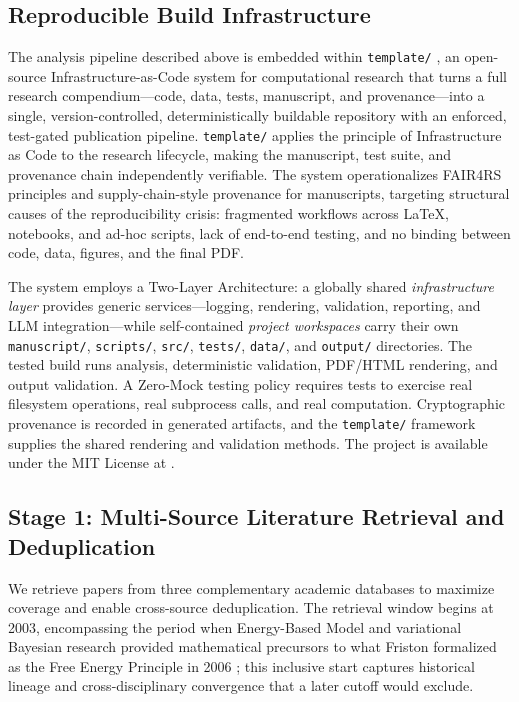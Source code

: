 \documentclass[
  english,
]{article}
\begin{document}
\subsection{Reproducible Build
Infrastructure}\label{reproducible-build-infrastructure}

The analysis pipeline described above is embedded within
\texttt{template/}
\citep{Friedman2026TemplateReproducibleGenerative, FriedmanTemplateSoftware},
an open-source Infrastructure-as-Code system for computational research
that turns a full research compendium---code, data, tests, manuscript,
and provenance---into a single, version-controlled, deterministically
buildable repository with an enforced, test-gated publication pipeline.
\texttt{template/} applies the principle of Infrastructure as Code to
the research lifecycle, making the manuscript, test suite, and
provenance chain independently verifiable. The system operationalizes
FAIR4RS principles \citep{wilkinson2016fair} and supply-chain-style
provenance for manuscripts, targeting structural causes of the
reproducibility crisis: fragmented workflows across LaTeX, notebooks,
and ad-hoc scripts, lack of end-to-end testing, and no binding between
code, data, figures, and the final PDF.

The system employs a Two-Layer Architecture: a globally shared
\emph{infrastructure layer} provides generic services---logging,
rendering, validation, reporting, and LLM integration---while
self-contained \emph{project workspaces} carry their own
\texttt{manuscript/}, \texttt{scripts/}, \texttt{src/}, \texttt{tests/},
\texttt{data/}, and \texttt{output/} directories. The tested build runs
analysis, deterministic validation, PDF/HTML rendering, and output
validation. A Zero-Mock testing policy requires tests to exercise real
filesystem operations, real subprocess calls, and real computation.
Cryptographic provenance is recorded in generated artifacts, and the
\texttt{template/} framework supplies the shared rendering and
validation methods. The project is available under the MIT License at
.

\newpage

\subsection{Stage 1: Multi-Source Literature Retrieval and
Deduplication}\label{sec:methods_retrieval}

We retrieve papers from three complementary academic databases to
maximize coverage and enable cross-source deduplication. The retrieval
window begins at 2003, encompassing the period when Energy-Based Model
and variational Bayesian research
\citep{dayan1995helmholtz, lecun2006tutorial} provided mathematical
precursors to what Friston formalized as the Free Energy Principle in
2006 \citep{friston2006free}; this inclusive start captures historical
lineage and cross-disciplinary convergence that a later cutoff would
exclude.
\end{document}
